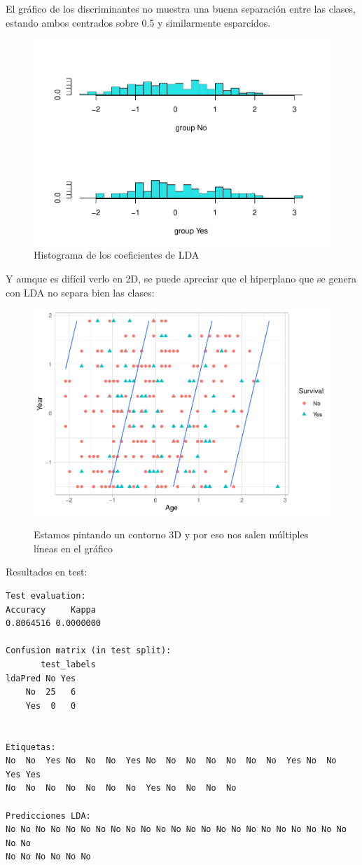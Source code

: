 El gráfico de los discriminantes no muestra una buena separación entre las clases, estando ambos centrados sobre 0.5 y similarmente esparcidos.
\begin{figure}[H]\center\includegraphics[width=.9\linewidth]{img/Clasificacion_files/figure-latex/unnamed-chunk-23-1}\caption{Histograma de los coeficientes de LDA}\end{figure}

Y aunque es difícil verlo en 2D, se puede apreciar que el hiperplano que se genera con LDA no separa bien las clases:
\begin{figure}[H]\center\includegraphics[width=.9\linewidth]{img/Clasificacion_files/figure-latex/unnamed-chunk-24-1}\caption{}\small{Estamos pintando un contorno 3D y por eso nos salen múltiples líneas en el gráfico}\end{figure}

\vspace{\baselineskip}

Resultados en test:
\begin{verbatim}
Test evaluation:
Accuracy     Kappa 
0.8064516 0.0000000

Confusion matrix (in test split):
       test_labels
ldaPred No Yes
    No  25   6
    Yes  0   0


Etiquetas:
No  No  Yes No  No  No  Yes No  No  No  No  No  No  No  Yes No  No  Yes Yes
No  No  No  No  No  No  No  Yes No  No  No  No 

Predicciones LDA:
No No No No No No No No No No No No No No No No No No No No No No No No No
No No No No No No
\end{verbatim}

